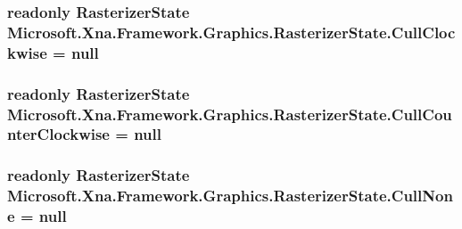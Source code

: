 \subsubsection[{Cull\+Clockwise}]{\setlength{\rightskip}{0pt plus 5cm}readonly {\bf Rasterizer\+State} Microsoft.\+Xna.\+Framework.\+Graphics.\+Rasterizer\+State.\+Cull\+Clockwise = null\hspace{0.3cm}{\ttfamily [static]}}\label{class_microsoft_1_1_xna_1_1_framework_1_1_graphics_1_1_rasterizer_state_aaaa680de38a8d4c73da5c31630e1b6cb}
\hypertarget{class_microsoft_1_1_xna_1_1_framework_1_1_graphics_1_1_rasterizer_state_a605e87c372be04b52360832e75b4fcd3}{}
\subsubsection[{Cull\+Counter\+Clockwise}]{\setlength{\rightskip}{0pt plus 5cm}readonly {\bf Rasterizer\+State} Microsoft.\+Xna.\+Framework.\+Graphics.\+Rasterizer\+State.\+Cull\+Counter\+Clockwise = null\hspace{0.3cm}{\ttfamily [static]}}\label{class_microsoft_1_1_xna_1_1_framework_1_1_graphics_1_1_rasterizer_state_a605e87c372be04b52360832e75b4fcd3}
\hypertarget{class_microsoft_1_1_xna_1_1_framework_1_1_graphics_1_1_rasterizer_state_a6d9f2e8b3fbc9ef4f09cc8cfcd05acd0}{}
\subsubsection[{Cull\+None}]{\setlength{\rightskip}{0pt plus 5cm}readonly {\bf Rasterizer\+State} Microsoft.\+Xna.\+Framework.\+Graphics.\+Rasterizer\+State.\+Cull\+None = null\hspace{0.3cm}{\ttfamily [static]}}\label{class_microsoft_1_1_xna_1_1_framework_1_1_graphics_1_1_rasterizer_state_a6d9f2e8b3fbc9ef4f09cc8cfcd05acd0}


